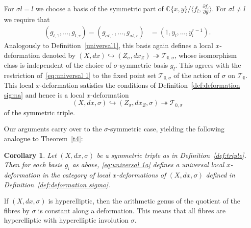 \documentclass[11pt,twoside]{amsart}
\theoremstyle{plain}
\newtheorem{Corollary}[theorem]{Corollary}
\newcommand{\Tm}{\mathcal{T}}
\newcommand{\dfx}{dx}
\begin{document}
For $\sigma l=l$ we choose a basis of the symmetric part of $\mathbb{C}\{x,y\}/\langle f_l,\frac{\partial f_l}{\partial y}\rangle$. 
For $\sigma l \neq l$ we require that 
\begin{align*}
(g_{l,1},\ldots,g_{l,r})=(g_{\sigma l,1},\ldots,g_{\sigma l,r})&=(1,y_l,\ldots,y_l^{r-1}).
\end{align*}
Analogously to Definition~\ref{universal1}, this basis again defines a local $x$-deformation denoted by
$(X,\dfx)\hookrightarrow(Z_\sigma,\dfx_Z)\twoheadrightarrow\Tm_{0,\sigma}$,
whose isomorphism class 
is independent of the choice of $\sigma $-symmetric basis $ g_l $. This agrees with the restriction of~\eqref{eq:universal 1} to the fixed point set $\Tm_{0,\sigma}$ of the action of $\sigma$ on $\Tm_0$.
This local $x$-deformation satisfies the conditions of Definition~\ref{def:deformation sigma} and hence is a local $x$-deformation
\begin{equation}\label{eq:universal 1a}
	(X,\dfx,\sigma)\hookrightarrow(Z_\sigma,\dfx_Z, \sigma)\twoheadrightarrow\Tm_{0,\sigma}
\end{equation}
of the symmetric triple.

Our arguments carry over to the $\sigma$-symmetric case, yielding the following analogue to Theorem~\ref{t4}:
\begin{Corollary}\label{universal 2a}
Let $(X,\dfx,\sigma)$ be a symmetric triple as in Definition~\ref{def:triple}. Then for each basis $g_l$ as above, \eqref{eq:universal 1a} defines a universal local $x$-deformation %
in the category of local $x$-deformations of $(X,\dfx,\sigma)$ defined in Definition~\ref{def:deformation sigma}. %
\end{Corollary}
If $(X,\dfx,\sigma)$ is hyperelliptic, then the arithmetic genus of the quotient of the fibres by $\sigma$ is constant along a deformation. This means that all fibres are hyperelliptic with hyperelliptic involution $\sigma$.
\end{document}
